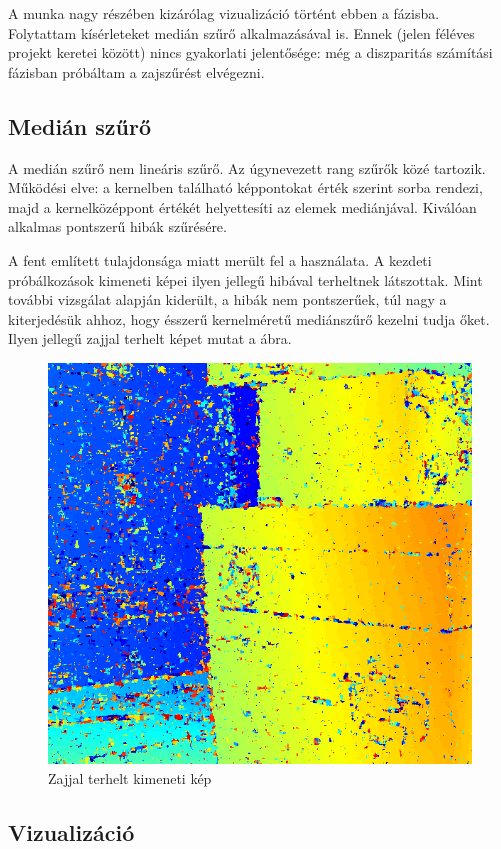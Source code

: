 A munka nagy részében kizárólag vizualizáció történt ebben a fázisba.
Folytattam kísérleteket medián szűrő alkalmazásával is.
Ennek (jelen féléves projekt keretei között) nincs gyakorlati jelentősége: még a diszparitás számítási fázisban próbáltam a zajszűrést elvégezni.

\subsection{Medián szűrő}\label{sect:median}

A medián szűrő nem lineáris szűrő.
Az úgynevezett rang szűrők közé tartozik.
Működési elve: a kernelben található képpontokat érték szerint sorba rendezi, majd a kernelközéppont értékét helyettesíti az elemek mediánjával.
Kiválóan alkalmas pontszerű hibák szűrésére.

A fent említett tulajdonsága miatt merült fel a használata.
A kezdeti próbálkozások kimeneti képei ilyen jellegű hibával terheltnek látszottak.
Mint további vizsgálat alapján kiderült, a hibák nem pontszerűek, túl nagy a kiterjedésük ahhoz, hogy ésszerű kernelméretű mediánszűrő kezelni tudja őket.
Ilyen jellegű zajjal terhelt képet mutat a  ábra.

\begin{figure}[ht!]
	\centering
	\includegraphics[width=0.6\linewidth]{figures/medianreason.png}
	\caption{Zajjal terhelt kimeneti kép}
	\label{fig:medianReason}
\end{figure}

\subsection{Vizualizáció}\label{sect:visual}

